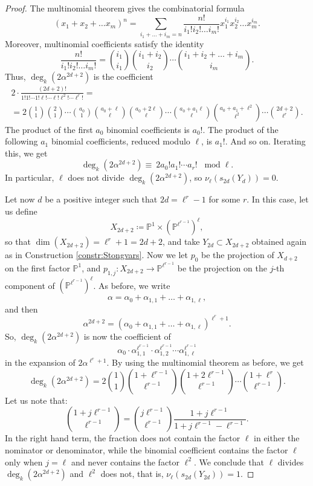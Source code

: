 \documentclass[10pt]{amsart}
\theoremstyle{definition}
\theoremstyle{plain}
\numberwithin{equation}{section}
\newcommand{\0}{\emptyset}
\renewcommand{\deg}{{\operatorname{deg}}}
\renewcommand{\dim}{{\operatorname{dim}}}
\begin{document}
\begin{proof}
The multinomial theorem gives the combinatorial formula
$$(x_1 +x_2 + \ldots x_m)^n=\sum_{i_1 + \ldots +i_m=n}\frac{n!}{i_1!i_2!\ldots i_m!} x_1^{i_1}x_2^{i_2}\ldots x_m^{i_m}.$$
Moreover, multinomial coefficients satisfy the identity
$$\frac{n!}{i_1!i_2!\ldots i_m!} =\binom{i_1}{i_1} \binom{i_1+i_2}{i_2}\cdots \binom{i_1+i_2+\ldots +i_m}{i_m}.$$
Thus, $\deg_k(2\alpha^{2d+2})$ is the coefficient
\begin{multline*}
     2 \cdot \frac{(2d+2)!}{1!1!\cdots 1!\ell! \cdots \ell! \ell^{2}! \cdots \ell^r!}= \\ = 2 \binom{1}{1}\binom{2}{1} \cdots \binom{a_0}{1} \binom{a_0+\ell}{\ell}\binom{a_0+2\ell}{\ell} \cdots \binom{a_0+a_1\ell}{\ell} \binom{a_0+a_1+\ell^2}{\ell^2} \cdots\binom{2d+2}{\ell^r}.
\end{multline*}
The product of the first $a_0$ binomial coefficients is $a_0!$. The product of the following $a_1$ binomial coefficients, reduced modulo $\ell$, is $a_1!$. And so on. Iterating this, we get
$$\deg_k(2\alpha^{2d+2}) \equiv\ 2a_0!a_1! \cdots a_r! \; \; \; \text{mod}\;\ell.$$
In particular, $\ell$ does not divide $\deg_k(2\alpha^{2d+2})$, so $\nu_{\ell}(s_{2d}(Y_d))=0$.

Let now $d$ be a positive integer such that $2d=\ell^r-1$ for some $r$. In this case, let us define
$$X_{2d+2} \coloneqq \mathbb{P}^1 \times (\mathbb{P}^{\ell^{r-1}})^{\ell},$$
so that $\dim(X_{2d+2})=\ell^r+1=2d+2$, and take $Y_{2d} \subset X_{2d+2}$ obtained again as in Construction \ref{constr:Stongvars}. Now we let $p_0$ be the projection of $X_{d+2}$ on the first factor $\mathbb{P}^1$, and $p_{1,j}:X_{2d+2} \to \mathbb{P}^{\ell^{r-1}}$ be the projection on the $j$-th component of $(\mathbb{P}^{\ell^{r-1}})^{\ell}$. As before, we write 
$$\alpha=\alpha_0 +\alpha_{1,1} +\ldots + \alpha_{1,\ell},$$
and then
$$\alpha^{2d+2}=(\alpha_0 +\alpha_{1,1} +\ldots + \alpha_{1,\ell})^{\ell^r+1}.$$
So, $\deg_k(2\alpha^{2d+2})$ is now the coefficient of
$$\alpha_0 \cdot \alpha_{1,1}^{\ell^{r-1}} \cdot \alpha_{1,2}^{\ell^{r-1}} \cdots \alpha_{1,\ell}^{\ell^{r-1}}$$
in the expansion of $2\alpha^{\ell^r+1}$. By using the multinomial theorem as before, we get
$$\deg_k(2\alpha^{2d+2})=2\binom{1}{1}\binom{1+\ell^{r-1}}{\ell^{r-1}}\binom{1+2\ell^{r-1}}{\ell^{r-1}} \cdots \binom{1+\ell^r}{\ell^{r-1}}.$$
Let us note that:
$$\binom{1+j\ell^{r-1}}{\ell^{r-1}}=\binom{j\ell^{r-1}}{\ell^{r-1}}\frac{1+j\ell^{r-1}}{1+j\ell^{r-1}-\ell^{r-1}}.$$
In the right hand term, the fraction does not contain the factor $\ell$ in either the nominator or denominator, while the binomial coefficient contains the factor $\ell$ only when $j=\ell$ and never contains the factor $\ell^2$. We conclude that $\ell$ divides $\deg_k(2\alpha^{2d+2})$ and $\ell^2$ does not, that is, $\nu_{\ell}(s_{2d}(Y_{2d}))=1$.
\end{proof}
\end{document}
